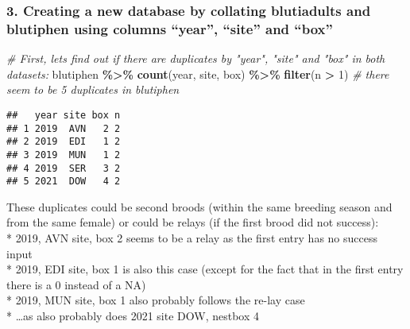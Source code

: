 \documentclass[
]{article}
\newenvironment{Shaded}{\begin{snugshade}}{\end{snugshade}}
\newcommand{\CommentTok}[1]{\textcolor[rgb]{0.56,0.35,0.01}{\textit{#1}}}
\newcommand{\DecValTok}[1]{\textcolor[rgb]{0.00,0.00,0.81}{#1}}
\newcommand{\FunctionTok}[1]{\textcolor[rgb]{0.13,0.29,0.53}{\textbf{#1}}}
\newcommand{\NormalTok}[1]{#1}
\newcommand{\SpecialCharTok}[1]{\textcolor[rgb]{0.81,0.36,0.00}{\textbf{#1}}}
\begin{document}
\subsubsection{3. Creating a new database by collating blutiadults and
blutiphen using columns ``year'', ``site'' and
``box''}\label{creating-a-new-database-by-collating-blutiadults-and-blutiphen-using-columns-year-site-and-box}

\begin{Shaded}
\begin{Highlighting}[]
\CommentTok{\# First, let\textquotesingle{}s find out if there are duplicates by "year", "site" and "box" in both datasets:}
\NormalTok{blutiphen }\SpecialCharTok{\%\textgreater{}\%}
  \FunctionTok{count}\NormalTok{(year, site, box) }\SpecialCharTok{\%\textgreater{}\%}
  \FunctionTok{filter}\NormalTok{(n }\SpecialCharTok{\textgreater{}} \DecValTok{1}\NormalTok{)  }\CommentTok{\# there seem to be 5 duplicates in blutiphen}
\end{Highlighting}
\end{Shaded}

\begin{verbatim}
##   year site box n
## 1 2019  AVN   2 2
## 2 2019  EDI   1 2
## 3 2019  MUN   1 2
## 4 2019  SER   3 2
## 5 2021  DOW   4 2
\end{verbatim}

These duplicates could be second broods (within the same breeding season
and from the same female) or could be relays (if the first brood did not
success):\\
* 2019, AVN site, box 2 seems to be a relay as the first entry has no
success input\\
* 2019, EDI site, box 1 is also this case (except for the fact that in
the first entry there is a 0 instead of a NA)\\
* 2019, MUN site, box 1 also probably follows the re-lay case\\
* \ldots as also probably does 2021 site DOW, nestbox 4
\end{document}
